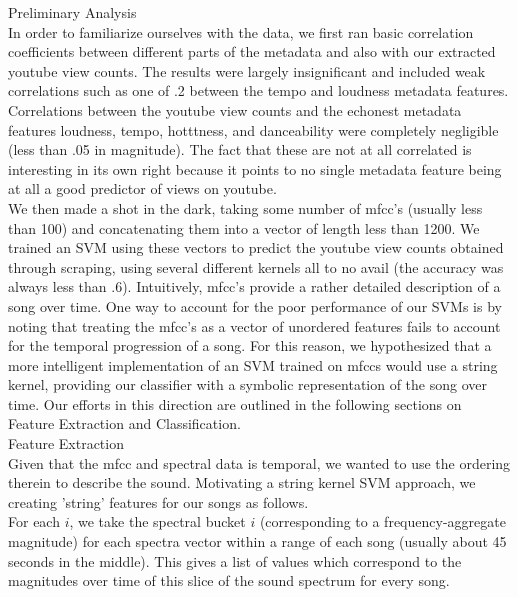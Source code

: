 \documentclass[11pt]{amsart}
\begin{document}
{\huge Preliminary Analysis \huge} \\

In order to familiarize ourselves with the data, we first ran basic correlation coefficients between different parts of the metadata and also with our extracted youtube view counts. The results were largely insignificant and included weak correlations such as one of .2 between the tempo and loudness metadata features. Correlations between the youtube view counts and the echonest metadata features loudness, tempo, hotttness, and danceability were completely negligible (less than .05 in magnitude). The fact that these are not at all correlated is interesting in its own right because it points to no single metadata feature being at all a good predictor of views on youtube. \\

We then made a shot in the dark, taking some number of mfcc's (usually less than 100) and concatenating them into a vector of length less than 1200. We trained an SVM using these vectors to predict the youtube view counts obtained through scraping, using several different kernels all to no avail (the accuracy was always less than .6). 
Intuitively, mfcc's provide a rather detailed description of a song over time. One way to account for the poor performance of our SVMs is by noting that treating the mfcc's as a vector of unordered features fails to account for the temporal progression of a song. For this reason, we hypothesized that a more intelligent implementation of an SVM  trained on mfccs would use a string kernel, providing our classifier with a symbolic representation of the song over time. Our efforts in this direction are outlined in the following sections on Feature Extraction and Classification.\\

{\huge Feature Extraction \huge} \\

Given that the mfcc and spectral data is temporal, we wanted to use the ordering therein to describe the sound. Motivating a string kernel SVM approach, we creating 'string' features for our songs as follows. \\

For each $i$, we take the spectral bucket $i$ (corresponding to a frequency-aggregate magnitude) for each spectra vector within a range of each song (usually about 45 seconds in the middle). This gives a list of values which correspond to the magnitudes over time of this slice of the sound spectrum for every song. \\
\end{document}
